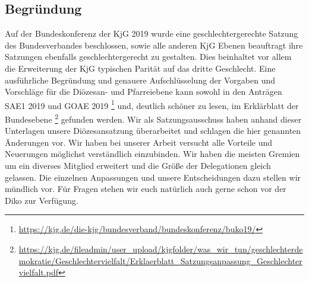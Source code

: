 \documentclass[12pt]{report}
\begin{document}
\begin{flushleft}
\chapter*{Begründung}
Auf der Bundeskonferenz der KjG 2019 wurde eine geschlechtergerechte Satzung des Bundesverbandes beschlossen, sowie alle anderen KjG Ebenen beauftragt ihre Satzungen ebenfalls geschlechtergerecht zu gestalten. Dies beinhaltet vor allem die Erweiterung der KjG typischen Parität auf das dritte Geschlecht.
Eine ausführliche Begründung und genauere Aufschlüsselung der Vorgaben und Vorschläge für die Diözesan- und Pfarreiebene kann sowohl in den Anträgen SAE1 2019 und GOAE 2019
\footnote{\url{https://kjg.de/die-kjg/bundesverband/bundeskonferenz/buko19/}} und, deutlich schöner zu lesen, im Erklärblatt der Bundesebene \footnote{\url{https://kjg.de/fileadmin/user_upload/kjgfolder/was_wir_tun/geschlechterdemokratie/Geschlechtervielfalt/Erklaerblatt_Satzungsanpassung_Geschlechtervielfalt.pdf}} gefunden werden. Wir als Satzungsausschuss haben anhand dieser Unterlagen unsere Diözesansatzung überarbeitet und schlagen die hier genannten Änderungen vor. Wir haben bei unserer Arbeit versucht alle Vorteile und Neuerungen möglichst verständlich einzubinden. Wir haben die meisten Gremien um ein diverses Mitglied erweitert und die Größe der Delegationen gleich gelassen. Die einzelnen Anpassungen und unsere Entscheidungen dazu stellen wir mündlich vor. Für Fragen stehen wir euch natürlich auch gerne schon vor der Diko zur Verfügung.


\end{flushleft}
\end{document}
